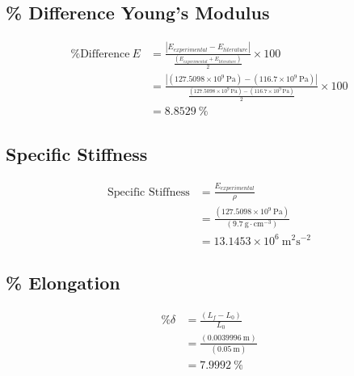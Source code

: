\documentclass[11pt]{article}
\begin{document}
        \subsection{\% Difference Young's Modulus}
        \vspace*{-\baselineskip}
        \begin{align*}
            \text{\% Difference}\ E
            &= \frac{\left\vert E_{experimental} - E_{literature} \right\vert}{\frac{\left( E_{experimental} + E_{literature} \right)}{2}} \times 100 \\
            &= \frac{\left\vert(127.5098\times10^{9}\ \text{Pa}) - (116.7\times10^{9}\ \text{Pa})\right\vert }{\frac{(127.5098\times10^{9}\ \text{Pa}) - (116.7\times10^{9}\ \text{Pa})}{2}} \times 100 \\
            &= 8.8529\ \text{\%}
        \end{align*}

        \subsection{Specific Stiffness}
        \vspace*{-\baselineskip}
        \begin{align*}
            \text{Specific Stiffness}
            &= \frac{E_{experimental}}{\rho} \\
            &= \frac{(127.5098\times10^{9}\ \text{Pa})}{(9.7\ \text{g}\cdot\text{cm}^{-3})} \\
            &= 13.1453\times10^6\ \text{m}^2\text{s}^{-2}
        \end{align*}

        \subsection{\% Elongation}
        \vspace*{-\baselineskip}
        \begin{align*}
            \text{\%}\delta 
            &= \frac{(L_f - L_0)}{L_0} \\
            &= \frac{(0.0039996\ \text{m})}{(0.05\ \text{m})} \\
            & = 7.9992\ \text{\%}
        \end{align*}
\end{document}
